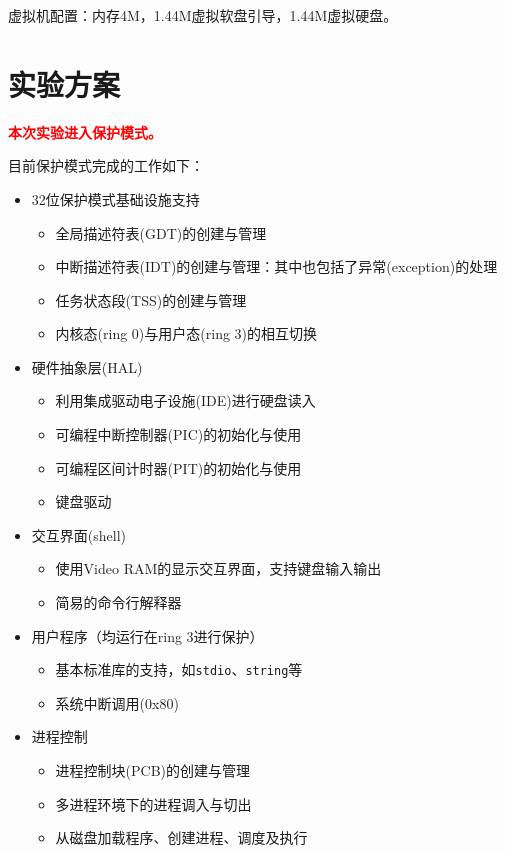 \documentclass[logo,reportComp]{thesis}
\begin{document}
虚拟机配置：内存4M，1.44M虚拟软盘引导，1.44M虚拟硬盘。

\section{实验方案}
{\Large\textbf{\textcolor{red}{本次实验进入保护模式。}}}

目前保护模式完成的工作如下：
\begin{itemize}
	\item 32位保护模式基础设施支持
	\begin{itemize}
		\item 全局描述符表(GDT)的创建与管理
		\item 中断描述符表(IDT)的创建与管理：其中也包括了异常(exception)的处理
		\item 任务状态段(TSS)的创建与管理
		\item 内核态(ring 0)与用户态(ring 3)的相互切换
	\end{itemize}
	\item 硬件抽象层(HAL)
	\begin{itemize}
		\item 利用集成驱动电子设施(IDE)进行硬盘读入
		\item 可编程中断控制器(PIC)的初始化与使用
		\item 可编程区间计时器(PIT)的初始化与使用
		\item 键盘驱动
	\end{itemize}
	\item 交互界面(shell)
	\begin{itemize}
		\item 使用Video RAM的显示交互界面，支持键盘输入输出
		\item 简易的命令行解释器
	\end{itemize}
	\item 用户程序（均运行在ring 3进行保护）
	\begin{itemize}
		\item 基本标准库的支持，如\verb'stdio'、\verb'string'等
		\item 系统中断调用(0x80)
	\end{itemize}
	\item 进程控制
	\begin{itemize}
		\item 进程控制块(PCB)的创建与管理
		\item 多进程环境下的进程调入与切出
		\item 从磁盘加载程序、创建进程、调度及执行
	\end{itemize}
\end{itemize}
\end{document}
